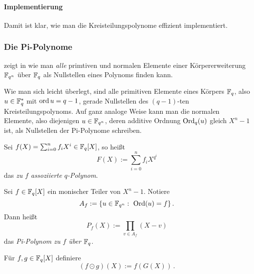 \paragraph{Implementierung}

Damit ist klar, wie man die Kreisteilungspolynome effizient implementiert.




\subsubsection{Die Pi-Polynome}

\citeauthor{hach92} zeigt in \autocite{hach92} wie man
\emph{alle} primtiven und normalen Elemente einer Körpererweiterung $\mathbb{F}_{q^n}$
über $\mathbb{F}_q$ als Nullstellen eines Polynoms finden kann.

\begin{bemerkung}
  \label{bem:primnorm}
  Wie man sich leicht überlegt, sind alle primitiven Elemente eines Körpers
  $\mathbb{F}_q$, also $u \in \mathbb{F}_q^\ast$ mit $\operatorname{ord} u = q-1$, gerade Nullstellen des
  $(q-1)$-ten Kreisteilungspolynoms. Auf ganz analoge Weise kann man die normalen
  Elemente, also diejenigen $u\in \mathbb{F}_{q^n}$, deren additive Ordnung 
  $\operatorname{Ord}_q(u)$ gleich $X^n-1$ ist, als Nullstellen der Pi-Polynome schreiben.
\end{bemerkung}

\begin{definition}
  Sei $f(X) = \sum_{i=0}^n f_i X^i \in \mathbb{F}_q[X]$, so heißt 
  \[ F(X) := \sum_{i=0}^n f_i X^{q^i}\]
  das \emph{zu $f$ assoziierte $q$-Polynom}.
\end{definition}

\begin{definition}
  Sei $f \in \mathbb{F}_q[X]$ ein monischer Teiler von $X^n-1$. Notiere
  \[ A_f := \{ u \in \mathbb{F}_{q^n}:\ \operatorname{Ord}(u) = f\}\,.\]
  Dann heißt 
  \[ P_f(X) := \prod_{v\in A_f} (X-v)\]
  das \emph{Pi-Polynom zu $f$ über $\mathbb{F}_q$}.
\end{definition}

\begin{definition}
  Für $f,g\in \mathbb{F}_q[X]$ definiere
  \[ (f\odot g)(X) := f(G(X))\,.\]
\end{definition}

